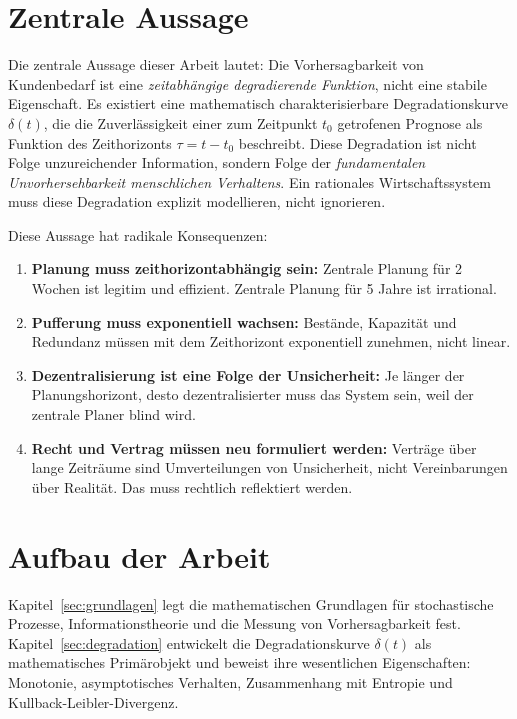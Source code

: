 \documentclass[12pt, a4paper, titlepage]{report}
\theoremstyle{definition}
\theoremstyle{remark}
\begin{document}
\section{Zentrale Aussage}

Die zentrale Aussage dieser Arbeit lautet: Die Vorhersagbarkeit von Kundenbedarf ist eine \emph{zeitabhängige degradierende Funktion}, nicht eine stabile Eigenschaft. Es existiert eine mathematisch charakterisierbare Degradationskurve $\delta(t)$, die die Zuverlässigkeit einer zum Zeitpunkt $t_0$ getrofenen Prognose als Funktion des Zeithorizonts $\tau = t - t_0$ beschreibt. Diese Degradation ist nicht Folge unzureichender Information, sondern Folge der \emph{fundamentalen Unvorhersehbarkeit menschlichen Verhaltens}. Ein rationales Wirtschaftssystem muss diese Degradation explizit modellieren, nicht ignorieren.

Diese Aussage hat radikale Konsequenzen:

\begin{enumerate}[label=(\roman*)]
  \item \textbf{Planung muss zeithorizontabhängig sein:} Zentrale Planung für 2 Wochen ist legitim und effizient. Zentrale Planung für 5 Jahre ist irrational.
  
  \item \textbf{Pufferung muss exponentiell wachsen:} Bestände, Kapazität und Redundanz müssen mit dem Zeithorizont exponentiell zunehmen, nicht linear.
  
  \item \textbf{Dezentralisierung ist eine Folge der Unsicherheit:} Je länger der Planungshorizont, desto dezentralisierter muss das System sein, weil der zentrale Planer blind wird.
  
  \item \textbf{Recht und Vertrag müssen neu formuliert werden:} Verträge über lange Zeiträume sind Umverteilungen von Unsicherheit, nicht Vereinbarungen über Realität. Das muss rechtlich reflektiert werden.
\end{enumerate}

\section{Aufbau der Arbeit}

Kapitel~\ref{sec:grundlagen} legt die mathematischen Grundlagen für stochastische Prozesse, Informationstheorie und die Messung von Vorhersagbarkeit fest. Kapitel~\ref{sec:degradation} entwickelt die Degradationskurve $\delta(t)$ als mathematisches Primärobjekt und beweist ihre wesentlichen Eigenschaften: Monotonie, asymptotisches Verhalten, Zusammenhang mit Entropie und Kullback-Leibler-Divergenz.
\end{document}
